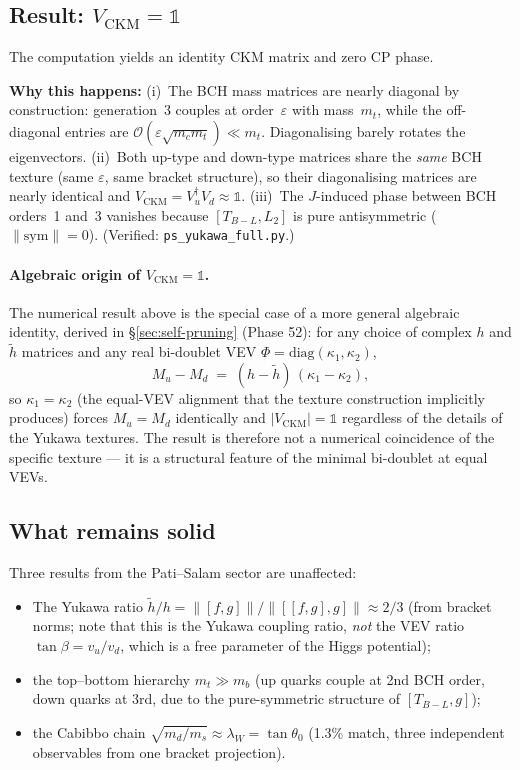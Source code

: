 \documentclass[11pt,a4paper]{article}
\theoremstyle{plain}
\theoremstyle{definition}
\theoremstyle{remark}
\begin{document}
\subsection*{Result: $V_{\mathrm{CKM}} = \mathbb{1}$}

The computation yields an identity CKM matrix and zero CP phase.

\textbf{Why this happens:}
(i)~The BCH mass matrices are nearly diagonal by construction:
generation~3 couples at order~$\varepsilon$ with mass~$m_t$, while
the off-diagonal entries are $\mathcal{O}(\varepsilon\sqrt{m_c m_t})
\ll m_t$.  Diagonalising barely rotates the eigenvectors.
(ii)~Both up-type and down-type matrices share the \emph{same}
BCH texture (same $\varepsilon$, same bracket structure), so their
diagonalising matrices are nearly identical and
$V_{\mathrm{CKM}} = V_u^\dagger V_d \approx \mathbb{1}$.
(iii)~The $J$-induced phase between BCH orders~1 and~3 vanishes
because $[T_{B{-}L}, L_2]$ is pure antisymmetric
($\|\mathrm{sym}\| = 0$).
(Verified: \texttt{ps\_yukawa\_full.py}.)

\paragraph{Algebraic origin of $V_{\mathrm{CKM}} = \mathbb{1}$.}
The numerical result above is the special case of a more general
algebraic identity, derived in \S\ref{sec:self-pruning} (Phase 52):
for any choice of complex $h$ and $\tilde{h}$ matrices and any real
bi-doublet VEV $\Phi = \mathrm{diag}(\kappa_1, \kappa_2)$,
\begin{equation}
  M_u - M_d \;=\; (h - \tilde{h})\,(\kappa_1 - \kappa_2),
\end{equation}
so $\kappa_1 = \kappa_2$ (the equal-VEV alignment that the texture
construction implicitly produces) forces $M_u = M_d$ identically and
$|V_{\mathrm{CKM}}| = \mathbb{1}$ regardless of the details of the
Yukawa textures.  The result is therefore not a numerical coincidence
of the specific texture --- it is a structural feature of the minimal
bi-doublet at equal VEVs.

\subsection*{What remains solid}

Three results from the Pati--Salam sector are unaffected:
\begin{itemize}[noitemsep]
  \item The Yukawa ratio $\tilde{h}/h = \|[f,g]\| / \|[[f,g],g]\| \approx 2/3$ (from
    bracket norms; note that this is the Yukawa coupling ratio, \emph{not} the VEV
    ratio $\tan\beta = v_u/v_d$, which is a free parameter of the Higgs potential);
  \item the top--bottom hierarchy $m_t \gg m_b$ (up quarks couple at
    2nd BCH order, down quarks at 3rd, due to the pure-symmetric
    structure of $[T_{B{-}L}, g]$);
  \item the Cabibbo chain $\sqrt{m_d/m_s} \approx \lambda_W = \tan\theta_0$
    (1.3\% match, three independent observables from one bracket projection).
\end{itemize}
\end{document}
